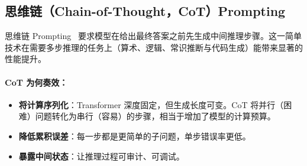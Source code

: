 \subsection{思维链（Chain-of-Thought，CoT）Prompting}
\label{chain-of-thought-cot-prompting}

思维链 Prompting~\cite{wei2022chain} 要求模型在给出最终答案之前先生成中间推理步骤。这一简单技术在需要多步推理的任务上（算术、逻辑、常识推断与代码生成）能带来显著的性能提升。

\paragraph{CoT 为何奏效：}
\label{why-cot-works}

\begin{itemize}
  \item \textbf{将计算序列化}：Transformer 深度固定，但生成长度可变。CoT 将并行（困难）问题转化为串行（容易）的步骤，相当于增加了模型的计算预算。
  \item \textbf{降低累积误差}：每一步都是更简单的子问题，单步错误率更低。
  \item \textbf{暴露中间状态}：让推理过程可审计、可调试。
\end{itemize}

